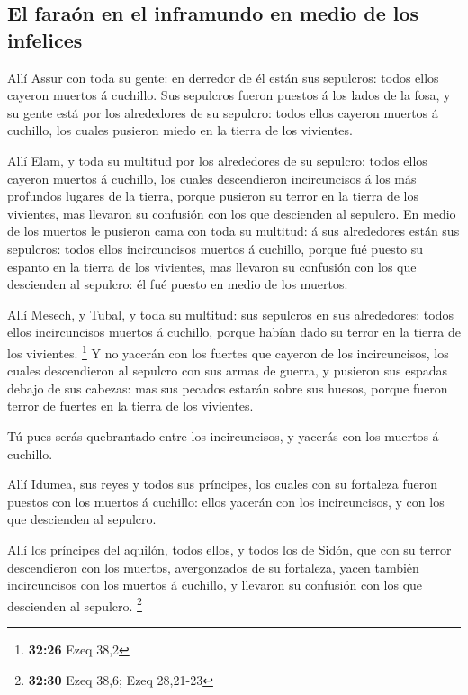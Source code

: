 \hypertarget{el-farauxf3n-en-el-inframundo-en-medio-de-los-infelices}{%
\subsection{El faraón en el inframundo en medio de los
infelices}\label{el-farauxf3n-en-el-inframundo-en-medio-de-los-infelices}}

 Allí Assur con toda su gente: en derredor de él están
sus sepulcros: todos ellos cayeron muertos á cuchillo. 
Sus sepulcros fueron puestos á los lados de la fosa, y su gente está por
los alrededores de su sepulcro: todos ellos cayeron muertos á cuchillo,
los cuales pusieron miedo en la tierra de los vivientes.

 Allí Elam, y toda su multitud por los alrededores de su
sepulcro: todos ellos cayeron muertos á cuchillo, los cuales
descendieron incircuncisos á los más profundos lugares de la tierra,
porque pusieron su terror en la tierra de los vivientes, mas llevaron su
confusión con los que descienden al sepulcro.  En medio
de los muertos le pusieron cama con toda su multitud: á sus alrededores
están sus sepulcros: todos ellos incircuncisos muertos á cuchillo,
porque fué puesto su espanto en la tierra de los vivientes, mas llevaron
su confusión con los que descienden al sepulcro: él fué puesto en medio
de los muertos.

 Allí Mesech, y Tubal, y toda su multitud: sus sepulcros
en sus alrededores: todos ellos incircuncisos muertos á cuchillo, porque
habían dado su terror en la tierra de los vivientes. \footnote{\textbf{32:26}
  Ezeq 38,2}  Y no yacerán con los fuertes que cayeron de
los incircuncisos, los cuales descendieron al sepulcro con sus armas de
guerra, y pusieron sus espadas debajo de sus cabezas: mas sus pecados
estarán sobre sus huesos, porque fueron terror de fuertes en la tierra
de los vivientes.

 Tú pues serás quebrantado entre los incircuncisos, y
yacerás con los muertos á cuchillo.

 Allí Idumea, sus reyes y todos sus príncipes, los cuales
con su fortaleza fueron puestos con los muertos á cuchillo: ellos
yacerán con los incircuncisos, y con los que descienden al sepulcro.

 Allí los príncipes del aquilón, todos ellos, y todos los
de Sidón, que con su terror descendieron con los muertos, avergonzados
de su fortaleza, yacen también incircuncisos con los muertos á cuchillo,
y llevaron su confusión con los que descienden al sepulcro. \footnote{\textbf{32:30}
  Ezeq 38,6; Ezeq 28,21-23}

